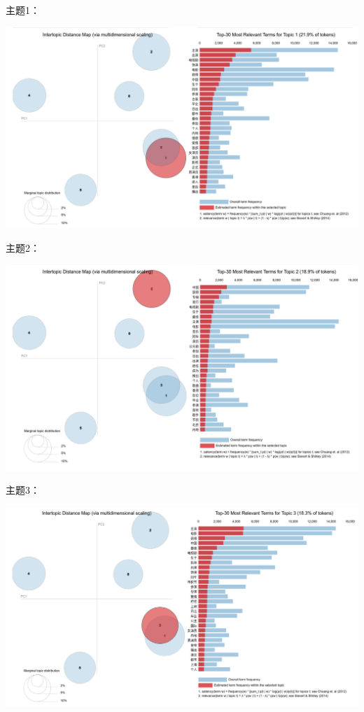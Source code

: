 \documentclass{article} [NO-DEFAULT-PACKAGES] \usepackage{wx672hyperref}
\begin{document}
主题1：

\begin{center}
\includegraphics[width=1.0\linewidth]{./static/topic-vis-01.png}
\end{center}

主题2：

\begin{center}
\includegraphics[width=1.0\linewidth]{./static/topic-vis-02.png}
\end{center}  

主题3：

\begin{center}
\includegraphics[width=1.0\linewidth]{./static/topic-vis-03.png}
\end{center}
\end{document}
